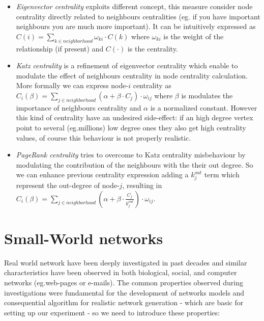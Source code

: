 \begin{description}
\begin{itemize}
\item \emph{Eigenvector centrality} exploits different concept, this measure consider node centrality directly related to neighbours centralities\cite[7.2]{newman:2010} (eg. if you have important neighbours you are much more important). It can be intuitively expressed as $C(i)=\sum_{k \in neighborhood}{\omega_{ki} \cdot C(k)}$ where $\omega_{ki}$ is the weight of the relationship (if present) and $C(\cdot)$ is the centrality.

\item \emph{Katz centrality} is a refinement of eigenvector centrality which enable to modulate the effect of neighbours centrality in node centrality calculation. More formally we can express node-$i$ centrality as $C_{i}(\beta)= \sum_{j \in neighborhood}{(\alpha + \beta \cdot C_{j})\cdot \omega_{ij}}$ where $\beta$ is modulates the importance of neighbours centrality and $\alpha$ is a normalized constant. However this kind of centrality have an undesired side-effect: if an high degree vertex point to several (eg.millions) low degree ones they also get high centrality values, of course this behaviour is not properly realistic\cite[7.4]{newman:2010}.

\item \emph{PageRank centrality} tries to overcome to Katz centrality misbehaviour by modulating the contribution of the neighbours with the their out degree. So we can enhance previous centrality expression adding a $k_{j}^{out}$ term which represent the out-degree of node-$j$, resulting in $C_{i}(\beta)= \sum_{j \in neighborhood}{(\alpha + \beta \cdot \frac{C_{j}}{k_{j}^{out}} )\cdot \omega_{ij}}$.
\end{itemize}
\end{description}

\section{Small-World networks}
\label{sn_smallworld}
Real world network have been deeply investigated in past decades and similar characteristics have been observed in both biological, social, and computer networks (eg.web-pages or e-mails\cite{ebel02:_scale}). 
The common properties observed during investigations were fundamental for the development of networks models and consequential algorithm for realistic network generation - which are basic for setting up our experiment - so we need to introduce these properties:

